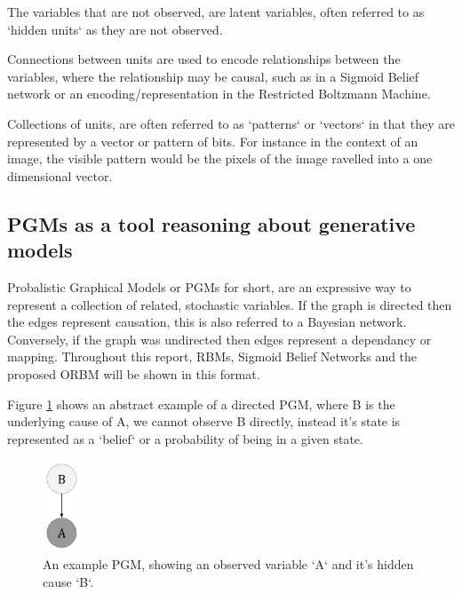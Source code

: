 The variables that are not observed, are latent variables, often referred to as `hidden units` as they are not observed.

Connections between units are used to encode relationships between the variables, where the relationship may be causal, such as in a Sigmoid Belief network or an encoding/representation in the Restricted Boltzmann Machine.

Collections of units, are often referred to as `patterns` or `vectors` in that they are represented by a vector or pattern of bits. For instance in the context of an image, the visible pattern would be the pixels of the image ravelled into a one dimensional vector.


\subsection{PGMs as a tool reasoning about generative models}
\todo%
Probalistic Graphical Models or PGMs for short, are an expressive way to represent a collection of related, stochastic variables. If the graph is directed then the edges represent causation, this is also referred to a Bayesian network. Conversely, if the graph was undirected then edges represent a dependancy or mapping. Throughout this report, RBMs, Sigmoid Belief Networks and the proposed ORBM will be shown in this format.

Figure \ref{F:PGM-example} shows an abstract example of a directed PGM, where B is the underlying cause of A, we cannot observe B directly, instead it's state is represented as a `belief` or a probability of being in a given state.

\begin{figure}[h]
\begin{center}
  \includegraphics[width = 0.1\textwidth]{Assets/PGM_Example_1.png}
\caption{An example PGM, showing an observed variable `A` and it's hidden cause `B`.}
\label{F:PGM-example}
\end{center}
\end{figure}

